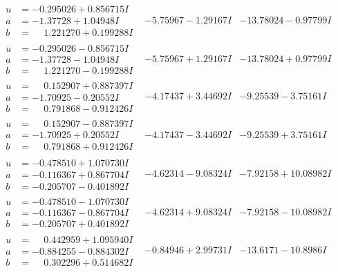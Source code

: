 \documentclass[1p]{elsarticle_modified}
\theoremstyle{definition}
\begin{document}
$$\begin{array}{c|c|c}
\begin{aligned}
u &= -0.295026 + 0.856715 I \\
a &= -1.37728 + 1.04948 I \\
b &= \phantom{-}1.221270 + 0.199288 I\end{aligned}
 & -5.75967 - 1.29167 I & -13.78024 - 0.97799 I \\ \hline\begin{aligned}
u &= -0.295026 - 0.856715 I \\
a &= -1.37728 - 1.04948 I \\
b &= \phantom{-}1.221270 - 0.199288 I\end{aligned}
 & -5.75967 + 1.29167 I & -13.78024 + 0.97799 I \\ \hline\begin{aligned}
u &= \phantom{-}0.152907 + 0.887397 I \\
a &= -1.70925 - 0.20552 I \\
b &= \phantom{-}0.791868 - 0.912426 I\end{aligned}
 & -4.17437 + 3.44692 I & -9.25539 - 3.75161 I \\ \hline\begin{aligned}
u &= \phantom{-}0.152907 - 0.887397 I \\
a &= -1.70925 + 0.20552 I \\
b &= \phantom{-}0.791868 + 0.912426 I\end{aligned}
 & -4.17437 - 3.44692 I & -9.25539 + 3.75161 I \\ \hline\begin{aligned}
u &= -0.478510 + 1.070730 I \\
a &= -0.116367 + 0.867704 I \\
b &= -0.205707 - 0.401892 I\end{aligned}
 & -4.62314 - 9.08324 I & -7.92158 + 10.08982 I \\ \hline\begin{aligned}
u &= -0.478510 - 1.070730 I \\
a &= -0.116367 - 0.867704 I \\
b &= -0.205707 + 0.401892 I\end{aligned}
 & -4.62314 + 9.08324 I & -7.92158 - 10.08982 I \\ \hline\begin{aligned}
u &= \phantom{-}0.442959 + 1.095940 I \\
a &= -0.884255 - 0.884302 I \\
b &= \phantom{-}0.302296 + 0.514682 I\end{aligned}
 & -0.84946 + 2.99731 I & -13.6171 - 10.8986 I \\ \hline\begin{aligned}

\end{aligned}
\end{array}$$
\end{document}
